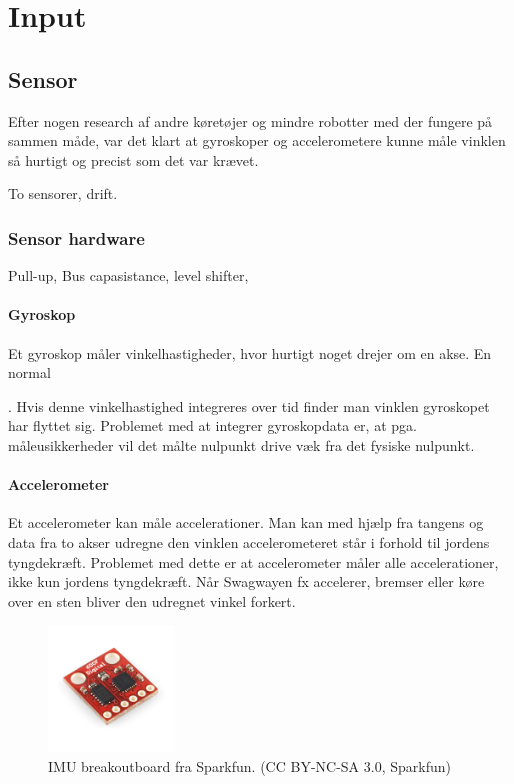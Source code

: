 \documentclass[a4paper,oneside,article,danish,table]{memoir}
\begin{document}
\chapter{Input}

\section{Sensor}
Efter nogen research af andre køretøjer og mindre robotter med der fungere på sammen måde, var det klart at gyroskoper og accelerometere kunne måle vinklen så hurtigt og precist som det var krævet.

To sensorer, drift.
\subsection{Sensor hardware}
Pull-up, Bus capasistance, level shifter,

\subsubsection{Gyroskop}
Et gyroskop måler vinkelhastigheder, hvor hurtigt noget drejer om en akse. En normal 

. Hvis denne vinkelhastighed integreres over tid finder man vinklen gyroskopet har flyttet sig. Problemet med at integrer gyroskopdata er, at pga. måleusikkerheder vil det målte nulpunkt drive væk fra det fysiske nulpunkt.

\subsubsection{Accelerometer}
Et accelerometer kan måle accelerationer. Man kan med hjælp fra tangens og data fra to akser udregne den vinklen accelerometeret står i forhold til jordens tyngdekræft. Problemet med dette er at accelerometer måler alle accelerationer, ikke kun jordens tyngdekræft. Når Swagwayen fx accelerer, bremser eller køre over en sten bliver den udregnet vinkel forkert.


\begin{figure}[htbp]
  \centering
  \includegraphics[width=0.3\textwidth]{pictures/imu.jpg}
  \caption[IMU breakoutboard fra Sparkfun]{IMU breakoutboard fra Sparkfun. (CC BY-NC-SA 3.0, Sparkfun)}
  \label{fig:imu}
\end{figure}
\end{document}
